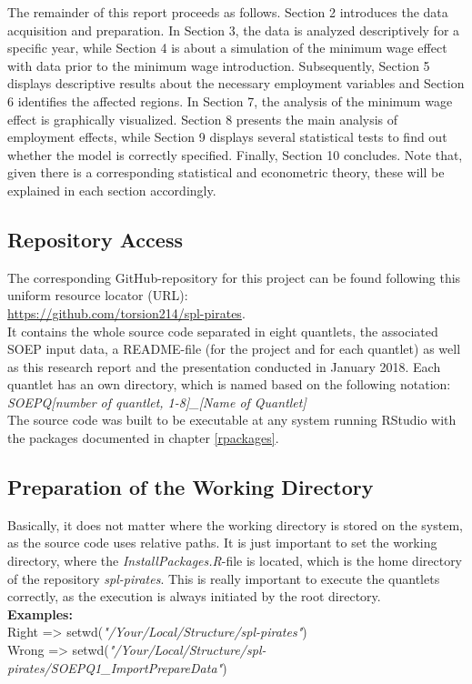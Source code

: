 \documentclass[a4paper]{article}
\begin{document}
The remainder of this report proceeds as follows. Section 2 introduces the data acquisition and preparation. In Section 3, the data is analyzed descriptively for a specific year, while Section 4 is about a simulation of the minimum wage effect with data prior to the minimum wage introduction. Subsequently, Section 5 displays descriptive results about the necessary employment variables and Section 6 identifies the affected regions. In Section 7, the analysis of the minimum wage effect is graphically visualized. Section 8 presents the main analysis of employment effects, while Section 9 displays several statistical tests to find out whether the model is correctly specified. Finally, Section 10 concludes.
Note that, given there is a corresponding statistical and econometric theory, these will be explained in each section accordingly.


\subsection{Repository Access}
The corresponding GitHub-repository for this project can be found following this uniform resource locator (URL):\\ \url{https://github.com/torsion214/spl-pirates}.\\
It contains the whole source code separated in eight quantlets, the associated SOEP input data, a README-file (for the project and for each quantlet) as well as this research report and the presentation conducted in January 2018. Each quantlet has an own directory, which is named based on the following notation: \\ \textit{SOEPQ[number of quantlet, 1-8]\_[Name of Quantlet]}\\  The source code was built to be executable at any system running RStudio with the packages documented in chapter \ref{rpackages}.

\subsection{Preparation of the Working Directory} 
Basically, it does not matter where the working directory is stored on the system, as the source code uses relative paths. It is just important to set the working directory, where the \textit{InstallPackages.R}-file is located, which is the home directory of the repository \textit{spl-pirates}.  
This is really important to execute the quantlets correctly, as the execution is always initiated by the root directory. \\ 
\textbf{Examples: }\\
Right => setwd(\textit{"/Your/Local/Structure/spl-pirates"}) \\  
Wrong => setwd(\textit{"/Your/Local/Structure/spl-pirates/SOEPQ1\_ImportPrepareData"}) \\
\end{document}
